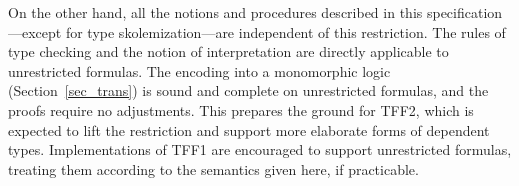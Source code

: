 On the other hand, all the notions and procedures described in this
specification---except for type skolemization---are independent of this
restriction. The rules of type checking and the notion of interpretation are
directly applicable to unrestricted formulas. The encoding into a monomorphic
logic (Section~\ref{sec_trans}) is sound and complete on unrestricted formulas,
and the proofs require
no adjustments. This prepares the ground for TFF2, which is expected to lift the
restriction and support more elaborate forms of dependent types. Implementations
of TFF1 are encouraged to support unrestricted formulas, treating them according
to the semantics given here, if practicable.


